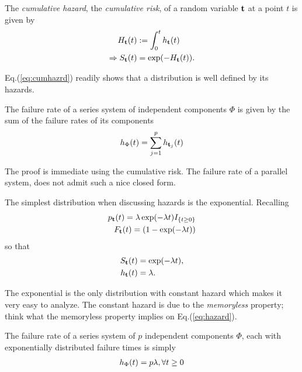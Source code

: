 \begin{definition}
The \emph{cumulative hazard}, \aka the \emph{cumulative risk}, of a random variable $\mathbf{t}$ at a point $t$ is given by 
\begin{align}
	H_{\mathbf{t}} (t) &:= \int_{0}^{t}h_{\mathbf{t}} (t) \\
	\Rightarrow S_{\mathbf{t}} (t) &= \exp(-H_{\mathbf{t}} (t)). \label{eq:cumhazrd}
\end{align}
\end{definition}
Eq.(\ref{eq:cumhazrd}) readily shows that a distribution is well defined by its hazards.



\begin{theorem}
The failure rate of a series system of independent components $\Phi$ is given by the sum of the failure rates of its components
\begin{align}
	h_{\Phi} (t)= \sum_{j=1}^{p} h_{\mathbf{t}_j} (t)
\end{align}
\end{theorem}
The proof is immediate using the cumulative risk.
The failure rate of a parallel system, does not admit such a nice closed form.

\begin{example}
The simplest distribution when discussing hazards is the exponential.
Recalling
\begin{align}
	p_{\mathbf{t}} (t)= \lambda \exp(-\lambda t) I_{\{ t \geq 0 \}} \\
	F_{\mathbf{t}} (t)= (1-\exp(-\lambda t)) 
\end{align}
so that 
\begin{align}
	S_{\mathbf{t}} (t) &= \exp(-\lambda t), \\
	h_{\mathbf{t}} (t) &= \lambda.
\end{align}
\end{example}
The exponential is the only distribution with constant hazard which makes it very easy to analyze.
The constant hazard is due to the \emph{memoryless} property; think what the memoryless property implies on Eq.(\ref{eq:hazard}).



\begin{example}
The failure rate of a series system of $p$ independent components $\Phi$, each with exponentially distributed failure times is simply 
\begin{align}
	h_{\Phi} (t)= p \lambda, \forall t \geq 0
\end{align}
\end{example}


